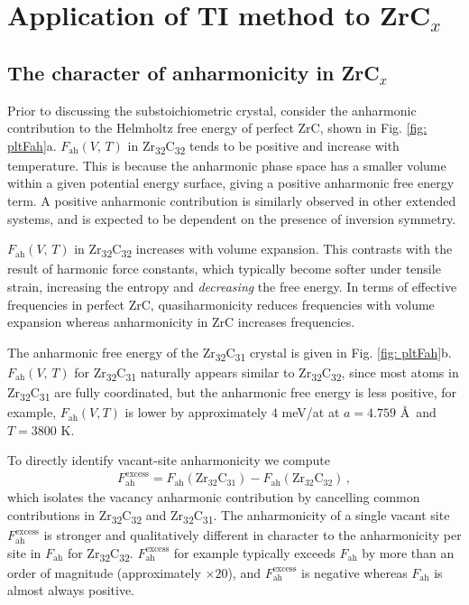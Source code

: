 \documentclass[twocolumn,american,aps,prb,showpacs,showkeys,amsmath,amssymb,superscriptaddress,a4]{revtex4-1}
\begin{document}
\section{Application of TI method to ZrC\protect $_x$ \label{sec: Application} }

\subsection{The character of anharmonicity in ZrC\protect$_x$\label{subsec: vacancyAnharmonicity}}

Prior to discussing the substoichiometric crystal, consider the anharmonic
contribution to the Helmholtz free energy of perfect ZrC, shown in
Fig. \ref{fig: pltFah}a. $F_{\text{ah}}(V,\,T)$ in
Zr\textsubscript{32}C\textsubscript{32} tends to be positive and
increase with temperature. This is because the anharmonic phase space
has a smaller volume within a given potential energy surface, giving
a positive anharmonic free energy term. A positive anharmonic contribution is similarly observed in other
extended systems,\cite{Glensk2014,Glensk2015,Zhang2018b} and is expected to be dependent on the presence of inversion symmetry.

$F_{\text{ah}}(V,\,T)$ in Zr\textsubscript{32}C\textsubscript{32}
increases with volume expansion. This contrasts with the result of harmonic
force constants, which typically become softer under tensile strain, increasing the entropy and \emph{decreasing} the free energy.
In terms of effective frequencies in perfect ZrC, quasiharmonicity
reduces frequencies with volume expansion whereas anharmonicity
in ZrC increases frequencies.

The anharmonic free energy of the Zr\textsubscript{32}C\textsubscript{31}
crystal is given in Fig. \ref{fig: pltFah}b. 
$F_{\text{ah}}(V,\,T)$ for Zr\textsubscript{32}C\textsubscript{31}
naturally appears similar to Zr\textsubscript{32}C\textsubscript{32}, since most atoms in Zr\textsubscript{32}C\textsubscript{31} are fully coordinated,
but the anharmonic free energy is less positive, for example, $F_{\text{ah}}(V,T)$ is lower by approximately $4$ meV/at at $a=4.759$ \AA \ and $T=3800$ K. 

To directly identify vacant-site anharmonicity we compute
\begin{align}
\label{eqn:excessF}
F_{\text{ah}}^{\text{excess}}=F_{\text{ah}}\left(\text{Zr}_{32}\text{C}_{31}\right)-F_{\text{ah}}\left(\text{Zr}_{32}\text{C}_{32}\right)\,,
\end{align}
which isolates the vacancy anharmonic contribution
by cancelling common contributions in Zr\textsubscript{32}C\textsubscript{32}
and Zr\textsubscript{32}C\textsubscript{31}. The anharmonicity of
a single vacant site $F_{\text{ah}}^{\text{excess}}$ is stronger
and qualitatively different in character to the anharmonicity per
site in $F_{\text{ah}}$ for Zr\textsubscript{32}C\textsubscript{32}.
$F_{\text{ah}}^{\text{excess}}$ for example typically exceeds $F_{\text{ah}}$ by 
more than an order of magnitude (approximately $\times20$),
and $F_{\text{ah}}^{\text{excess}}$ is negative whereas $F_{\text{ah}}$
is almost always positive.
\end{document}
